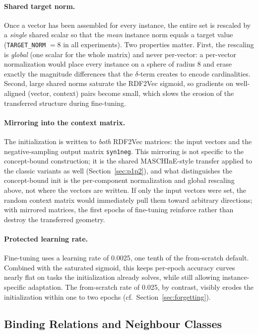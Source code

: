 \documentclass[a4paper,oneside,bibliography=totoc]{scrbook}
\begin{document}
\paragraph{Shared target norm.} Once a vector has been assembled for every
instance, the entire set is rescaled by a \emph{single} shared scalar so that the
\emph{mean} instance norm equals a target value (\texttt{TARGET\_NORM} $= 8$ in
all experiments). Two properties matter. First, the rescaling is \emph{global}
(one scalar for the whole matrix) and never per-vector: a per-vector
normalization would place every instance on a sphere of radius $8$ and erase
exactly the magnitude differences that the $\delta$-term creates to encode
cardinalities. Second, large shared norms saturate the RDF2Vec sigmoid, so
gradients on well-aligned (vector, context) pairs become small, which slows the
erosion of the transferred structure during fine-tuning.

\paragraph{Mirroring into the context matrix.} The initialization is written
to \emph{both} RDF2Vec matrices: the input vectors and the negative-sampling
output matrix \texttt{syn1neg}. This mirroring is not specific to the
concept-bound construction; it is the shared MASCHInE-style transfer applied to
the classic variants as well (Section~\ref{sec:p1p2}), and what distinguishes
the concept-bound init is the per-component normalization and global rescaling
above, not where the vectors are written. If only the input vectors were set, the random
context matrix would immediately pull them toward arbitrary directions; with
mirrored matrices, the first epochs of fine-tuning reinforce rather than
destroy the transferred geometry.

\paragraph{Protected learning rate.} Fine-tuning uses a learning rate of
0.0025, one tenth of the from-scratch default. Combined with the saturated
sigmoid, this keeps per-epoch accuracy curves nearly flat on tasks the
initialization already solves, while still allowing instance-specific
adaptation. The from-scratch rate of 0.025, by contrast, visibly erodes the
initialization within one to two epochs
(cf.\ Section~\ref{sec:forgetting}).

\subsection{Binding Relations and Neighbour Classes}
\label{sec:binding}
\end{document}
